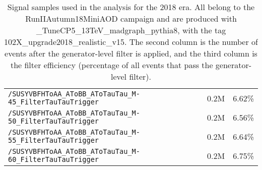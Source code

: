 \begin{table}[ht]
\begin{center}
{\begin{tabular}{|l|c|c|}
    \texttt{/SUSYVBFHToAA\_AToBB\_AToTauTau\_M-45\_FilterTauTauTrigger} & 0.2M & 6.62\%\\
    \texttt{/SUSYVBFHToAA\_AToBB\_AToTauTau\_M-50\_FilterTauTauTrigger} & 0.2M & 6.56\%\\
    \texttt{/SUSYVBFHToAA\_AToBB\_AToTauTau\_M-55\_FilterTauTauTrigger} & 0.2M & 6.64\%\\
    \texttt{/SUSYVBFHToAA\_AToBB\_AToTauTau\_M-60\_FilterTauTauTrigger} & 0.2M & 6.75\%\\
    \hline
    \end{tabular}
    }
    \end{center} 
    \caption{Signal samples used in the analysis for the 2018 era. All belong to the RunIIAutumn18MiniAOD campaign and are produced with \_TuneCP5\_13TeV\_madgraph\_pythia8, with the tag 102X\_upgrade2018\_realistic\_v15. The second column is the number of events after the generator-level filter is applied, and the third column is the filter efficiency (percentage of all events that pass the generator-level filter).}
    \label{tab:2018signal}
    \end{table}
    
